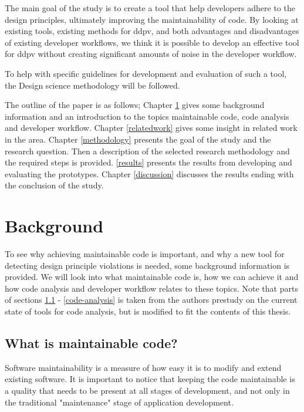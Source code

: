 \documentclass[pdftex,10pt,b5paper,twoside]{report}
\begin{document}
The main goal of the study is to create a tool that help developers adhere to the design principles, ultimately improving the maintainability of code. By looking at existing tools, existing methods for \acrfull{ddpv}, and both advantages and disadvantages of existing developer workflows, we think it is possible to develop an effective tool for \gls{ddpv} without creating significant amounts of noise in the developer workflow.

To help with specific guidelines for development and evaluation of such a tool, the Design science methodology will be followed.


The outline of the paper is as follows; Chapter \ref{background} gives some background information and an introduction to the topics maintainable code, code analysis and developer workflow. Chapter \ref{relatedwork} gives some insight in related work in the area. Chapter \ref{methodology} presents the goal of the study and the research question. Then a description of the selected research methodology and the required steps is provided. \ref{results} presents the results from developing and evaluating the prototypes. Chapter \ref{discussion} discusses the results ending with the conclusion of the study.  

\cleardoublepage
\chapter{Background}

\label{background}
To see why achieving maintainable code is important, and why a new tool for detecting design principle violations is needed, some background information is provided. We will look into what maintainable code is, how we can achieve it and how code analysis and developer workflow relates to these topics. Note that parts of sections \ref{maintainable-code} - \ref{code-analysis} is taken from the authors prestudy on the current state of tools for code analysis\cite{prestudy}, but is modified to fit the contents of this thesis.

\section{What is maintainable code?}
\label{maintainable-code}
Software maintainability is a measure of how easy it is to modify and extend existing software. It is important to notice that keeping the code maintainable is a quality that needs to be present at all stages of development, and not only in the traditional "maintenance" stage of application development.  
\end{document}
